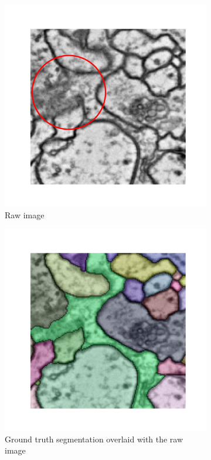 \begin{figure}[t]
\begin{subfigure}[t]{0.47\linewidth}
\centering
\includegraphics[width=0.65\linewidth,trim=1.50in 1.4in 1.4in 1.50in,clip]{./figs/affs_compare/raw_mod.pdf} %
\caption{\centering Raw image}
\end{subfigure}\hfill
\begin{subfigure}[t]{0.47\textwidth}
\centering
\includegraphics[width=0.65\linewidth,trim=1.50in 1.4in 1.4in 1.50in,clip]{./figs/affs_compare/GT.pdf} %
\caption{\centering Ground truth segmentation overlaid with the raw image}
\end{subfigure}\vspace{2em}\\
\begin{subfigure}[t]{0.47\linewidth}
\centering

\end{subfigure}
\end{figure}
